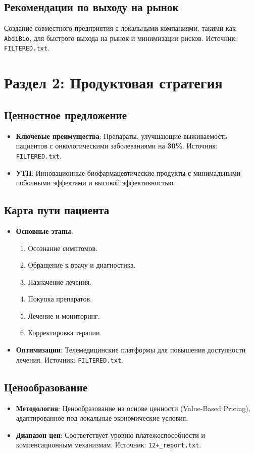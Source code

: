 \documentclass[a4paper,12pt]{article}
\begin{document}
\subsection{Рекомендации по выходу на рынок}
Создание совместного предприятия с локальными компаниями, такими как \texttt{AbdiBio}, для быстрого выхода на рынок и минимизации рисков. Источник: \texttt{FILTERED.txt}.

\section{Раздел 2: Продуктовая стратегия}

\subsection{Ценностное предложение}
\begin{itemize}
    \item \textbf{Ключевые преимущества}: Препараты, улучшающие выживаемость пациентов с онкологическими заболеваниями на \textbf{30\%}. Источник: \texttt{FILTERED.txt}.
    \item \textbf{УТП}: Инновационные биофармацевтические продукты с минимальными побочными эффектами и высокой эффективностью.
\end{itemize}

\subsection{Карта пути пациента}
\begin{itemize}
    \item \textbf{Основные этапы}:
    \begin{enumerate}
        \item Осознание симптомов.
        \item Обращение к врачу и диагностика.
        \item Назначение лечения.
        \item Покупка препаратов.
        \item Лечение и мониторинг.
        \item Корректировка терапии.
    \end{enumerate}
    \item \textbf{Оптимизации}: Телемедицинские платформы для повышения доступности лечения. Источник: \texttt{FILTERED.txt}.
\end{itemize}

\subsection{Ценообразование}
\begin{itemize}
    \item \textbf{Методология}: Ценообразование на основе ценности (Value-Based Pricing), адаптированное под локальные экономические условия.
    \item \textbf{Диапазон цен}: Соответствует уровню платежеспособности и компенсационным механизмам. Источник: \texttt{12+\_report.txt}.
\end{itemize}
\end{document}
